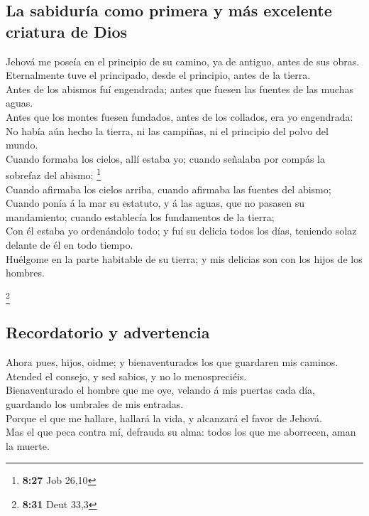 \hypertarget{la-sabiduruxeda-como-primera-y-muxe1s-excelente-criatura-de-dios}{%
\subsection{La sabiduría como primera y más excelente criatura de
Dios}\label{la-sabiduruxeda-como-primera-y-muxe1s-excelente-criatura-de-dios}}

 Jehová me poseía en el principio de su camino, ya de
antiguo, antes de sus obras.\\
 Eternalmente tuve el principado, desde el principio, antes
de la tierra.\\
 Antes de los abismos fuí engendrada; antes que fuesen las
fuentes de las muchas aguas.\\
 Antes que los montes fuesen fundados, antes de los
collados, era yo engendrada:\\
 No había aún hecho la tierra, ni las campiñas, ni el
principio del polvo del mundo.\\
 Cuando formaba los cielos, allí estaba yo; cuando señalaba
por compás la sobrefaz del abismo; \footnote{\textbf{8:27} Job 26,10}\\
 Cuando afirmaba los cielos arriba, cuando afirmaba las
fuentes del abismo;\\
 Cuando ponía á la mar su estatuto, y á las aguas, que no
pasasen su mandamiento; cuando establecía los fundamentos de la
tierra;\\
 Con él estaba yo ordenándolo todo; y fuí su delicia todos
los días, teniendo solaz delante de él en todo tiempo.\\
 Huélgome en la parte habitable de su tierra; y mis
delicias son con los hijos de los hombres.

\footnote{\textbf{8:31} Deut 33,3}

\hypertarget{recordatorio-y-advertencia}{%
\subsection{Recordatorio y
advertencia}\label{recordatorio-y-advertencia}}

 Ahora pues, hijos, oidme; y bienaventurados los que
guardaren mis caminos.\\
 Atended el consejo, y sed sabios, y no lo menospreciéis.\\
 Bienaventurado el hombre que me oye, velando á mis puertas
cada día, guardando los umbrales de mis entradas.\\
 Porque el que me hallare, hallará la vida, y alcanzará el
favor de Jehová.\\
 Mas el que peca contra mí, defrauda su alma: todos los que
me aborrecen, aman la muerte.

